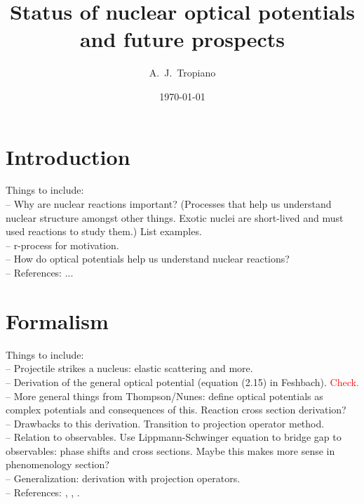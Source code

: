 \documentclass[preprintnumbers,floatfix,aps,prc,preprint,nofootinbib]{revtex4-1}
\begin{document}
\title{Status of nuclear optical potentials and future prospects}


\author{A.~J.~Tropiano}


\date{\today}

\maketitle

\newpage


\section{Introduction}
\label{sec:intro}


Things to include:
\\
-- Why are nuclear reactions important? (Processes that help us understand nuclear structure amongst other things. Exotic nuclei are short-lived and must used reactions to study them.) List examples.
\\
-- r-process for motivation.
\\
-- How do optical potentials help us understand nuclear reactions?
\\
-- References: ...


\section{Formalism}
\label{sec:formalism}


Things to include:
\\
-- Projectile strikes a nucleus: elastic scattering and more.
\\
-- Derivation of the general optical potential (equation (2.15) in Feshbach). \textcolor{red}{Check.}
\\
-- More general things from Thompson/Nunes: define optical potentials as complex potentials and consequences of this. Reaction cross section derivation?
\\
-- Drawbacks to this derivation. Transition to projection operator method.
\\
-- Relation to observables. Use Lippmann-Schwinger equation to bridge gap to observables: phase shifts and cross sections. Maybe this makes more sense in phenomenology section?
\\
-- Generalization: derivation with projection operators.
\\
-- References: \cite{Feshbach:1958nx}, \cite{Feshbach:1962ut}, \cite{thompson_nunes_2009}.
\\
\end{document}
